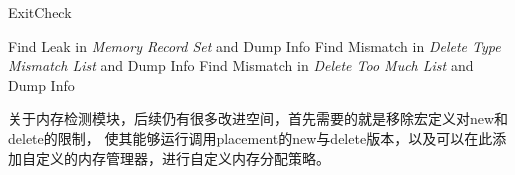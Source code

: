 \begin{breakablealgorithm}
\caption{ExitCheck} \label{exit check}
\begin{algorithmic}
        \State Find Leak in \emph{Memory Record Set} and Dump Info
        \State Find Mismatch in \emph{Delete Type Mismatch List} and Dump Info
        \State Find Mismatch in \emph{Delete Too Much List} and Dump Info
\EndProcedure
\end{algorithmic}
\end{breakablealgorithm}

关于内存检测模块，后续仍有很多改进空间，首先需要的就是移除宏定义对new和delete的限制，
使其能够运行调用placement的new与delete版本，以及可以在此添加自定义的内存管理器，进行自定义内存分配策略。
